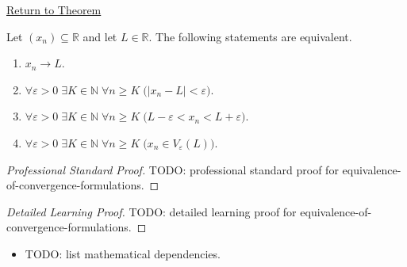 \newpage
{}
\label{prf:equivalence-of-convergence-formulations}

\begin{remark*}[Return]
\hyperref[thm:equivalence-of-convergence-formulations]{Return to Theorem}
\end{remark*}

\begin{theorem*}
Let $(x_n) \subseteq \mathbb{R}$ and let $L \in \mathbb{R}$. The following
statements are equivalent.
\begin{enumerate}[label=\textup{(\alph*)}]
    \item $x_n \to L$.
    \item $\forall \varepsilon > 0 \;\exists K \in \mathbb{N} \;\forall n \ge K
          \;\bigl(|x_n - L| < \varepsilon\bigr)$.
    \item $\forall \varepsilon > 0 \;\exists K \in \mathbb{N} \;\forall n \ge K
          \;\bigl(L - \varepsilon < x_n < L + \varepsilon\bigr)$.
    \item $\forall \varepsilon > 0 \;\exists K \in \mathbb{N} \;\forall n \ge K
          \;\bigl(x_n \in V_\varepsilon(L)\bigr)$.
\end{enumerate}

\smallskip
\noindent
\end{theorem*}

\begin{proof}[Professional Standard Proof]
\LRAProofBodyStart
TODO: professional standard proof for equivalence-of-convergence-formulations.
\end{proof}

\begin{proof}[Detailed Learning Proof]
\LRAProofBodyStart
TODO: detailed learning proof for equivalence-of-convergence-formulations.
\end{proof}

\begin{remark*}
\end{remark*}

\begin{dependencies}
\begin{itemize}
  \item TODO: list mathematical dependencies.
\end{itemize}
\end{dependencies}

\clearpage
